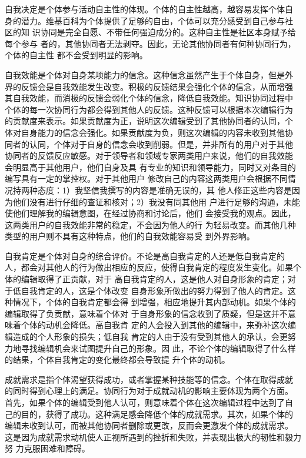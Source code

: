 自我决定是个体参与活动自主性的体现。个体的自主性越高，越容易发挥个体自
身的潜力。维基百科为个体提供了足够的自由，个体可以充分感受到自己参与社
区的知
识协同是完全自愿、不带任何强迫成分的。这种自主性是社区本身赋予给每个参与
者的，其他协同者无法剥夺。因此，无论其他协同者有何种协同行为，个体的自主性
都不会受到明显的影响。

自我效能是个体对自身某项能力的信念。这种信念虽然产生于个体自身，但是外
界的反馈会是自我效能发生改变。积极的反馈结果会强化个体的信念，从而增强
其自我效能，而消极的反馈会弱化个体的信念，降低自我效能。知识协同过程中
个体的每一次协同行为都会得到其他人的反馈。这种反馈可以根据本次编辑行为
的贡献度来表示。如果贡献度为正，说明这次编辑受到了其他协同者的认同，个
体对自身能力的信念会强化。如果贡献度为负，则这次编辑的内容未收到其他协
同者的认同，个体对于自身的信念会收到削弱。但是，并非所有的用户对于其他
协同者的反馈反应敏感。对于领导者和领域专家两类用户来说，他们的自我效能
会明显高于其他用户，他们自身及具
有专业的知识和领导能力，同时又对条目的编写具有一定的掌控权。对于其他用户
修改自己的内容这两类用户会根据不同情况持两种态度：1）我坚信我撰写的内容是准确无误的，其
他人修正这些内容是因为他们没有进行仔细的查证和核对；2）我没有同其他用
户进行足够的沟通，未能使他们理解我的编辑意图，在经过协商和讨论后，他们
会接受我的观点。因此，这两类用户的自我效能非常的稳定，不会因为他人的行
为轻易改变。而其他几种类型的用户则不具有这种特点，他们的自我效能容易受
到外界影响。

自我肯定是个体对自身的综合评价。不论是高自我肯定的人还是低自我肯定的
人，都会对其他人的行为做出相应的反应，使得自我肯定的程度发生变化。如果个体的编辑取得了正贡献，对于
高自我肯定的人，这是他人对自身形象的肯定；对于低自我肯定的人，这是个体改变
自身形象所做出的努力得到了他人的肯定。这种情况下，个体的自我肯定都会得
到增强，相应地提升其内部动机。如果个体的编辑取得了负贡献，意味着个体对
于自身形象的信念收到了质疑，但是这并不意味着个体的动机会降低。高自我肯
定的人会投入到其他的编辑中，来弥补这次编辑造成的个人形象的损失；低自我
肯定的人由于没有受到其他人的承认，会更努力地寻找编辑机会来试图提升自己的形象。因
此，不论个体的编辑取得了什么样的结果，个体自我肯定的变化最终都会导致提
升个体的动机。

成就需求是指个体渴望获得成功，或者掌握某种技能等的信念。个体在取得成就
的同时得到心理上的满足。协同行为对于成就动机的影响主要体现为两个方面。
首先，如果个体的编辑受到他人认可，则意味着个体在这次编辑过程中达到了自
己的目的，获得了成功。这种满足感会降低个体的成就需求。其次，如果个体的
编辑未收到认可，而被其他协同者删除或更改，反而会更激发个体的成就需求。
这是因为成就需求动机使人正视所遇到的挫折和失败，并表现出极大的韧性和毅力努
力克服困难和障碍。

